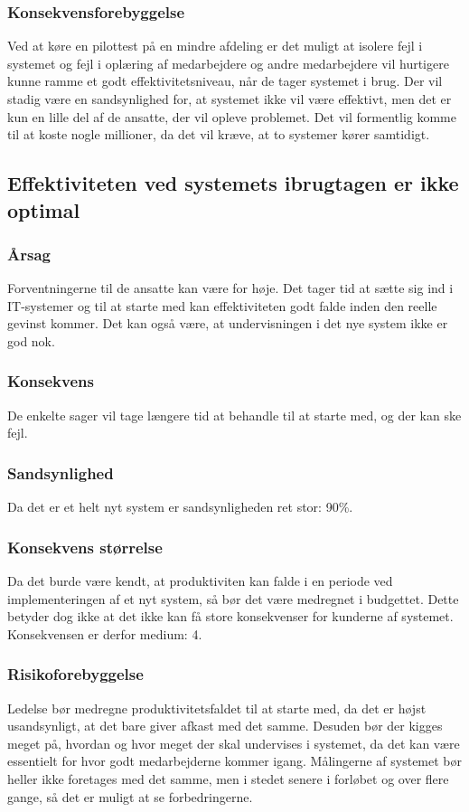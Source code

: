 \documentclass[10pt,a4paper,danish]{article}
\begin{document}
\subsubsection{Konsekvensforebyggelse}
Ved at køre en pilottest på en mindre afdeling er det muligt at isolere fejl i systemet og fejl i oplæring af medarbejdere og andre medarbejdere vil hurtigere kunne ramme et godt effektivitetsniveau, når de tager systemet i brug.
Der vil stadig være en sandsynlighed for, at systemet ikke vil være effektivt, men det er kun en lille del af de ansatte, der vil opleve problemet. Det vil formentlig komme til at koste nogle millioner, da det vil kræve, at to systemer kører samtidigt.

\subsection{Effektiviteten ved systemets ibrugtagen er ikke optimal}
\subsubsection{Årsag}
Forventningerne til de ansatte kan være for høje. Det tager tid at sætte sig ind i IT-systemer og til at starte med kan effektiviteten godt falde inden den reelle gevinst kommer. Det kan også være, at undervisningen i det nye system ikke er god nok.

\subsubsection{Konsekvens}
De enkelte sager vil tage længere tid at behandle til at starte med, og der kan ske fejl.

\subsubsection{Sandsynlighed}
Da det er et helt nyt system er sandsynligheden ret stor: 90\%.

\subsubsection{Konsekvens størrelse}
Da det burde være kendt, at produktiviten kan falde i en periode ved implementeringen af et nyt system, så bør det være medregnet i budgettet. Dette betyder dog ikke at det ikke kan få store konsekvenser for kunderne af systemet. Konsekvensen er derfor medium: 4.

\subsubsection{Risikoforebyggelse}
Ledelse bør medregne produktivitetsfaldet til at starte med, da det er højst usandsynligt, at det bare giver afkast med det samme. Desuden bør der kigges meget på, hvordan og hvor meget der skal undervises i systemet, da det kan være essentielt for hvor godt medarbejderne kommer igang. Målingerne af systemet bør heller ikke foretages med det samme, men i stedet senere i forløbet og over flere gange, så det er muligt at se forbedringerne. 
\end{document}

